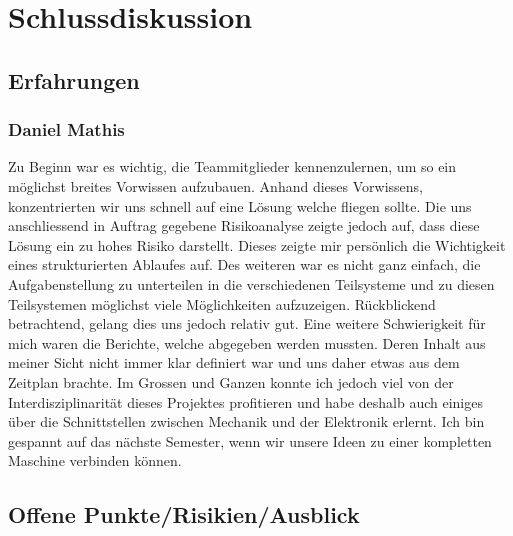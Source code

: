\section{Schlussdiskussion}

\subsection{Erfahrungen}

\subsubsection*{Daniel Mathis}
Zu Beginn war es wichtig, die Teammitglieder kennenzulernen, um so ein 
möglichst breites Vorwissen aufzubauen. Anhand dieses Vorwissens, 
konzentrierten wir uns schnell auf eine Lösung welche fliegen sollte. Die uns 
anschliessend in Auftrag gegebene Risikoanalyse zeigte jedoch auf, dass diese 
Lösung ein zu hohes Risiko darstellt. Dieses zeigte mir persönlich die 
Wichtigkeit eines strukturierten Ablaufes auf. Des weiteren war es nicht ganz 
einfach, die Aufgabenstellung zu unterteilen in die verschiedenen Teilsysteme 
und zu diesen Teilsystemen möglichst viele Möglichkeiten aufzuzeigen. 
Rückblickend betrachtend, gelang dies uns jedoch relativ gut. Eine weitere 
Schwierigkeit für mich waren die Berichte, welche abgegeben werden mussten. 
Deren Inhalt aus meiner Sicht nicht immer klar definiert war und uns daher 
etwas aus dem Zeitplan brachte. Im Grossen und Ganzen konnte ich jedoch viel 
von der Interdisziplinarität dieses Projektes profitieren und habe deshalb 
auch einiges über die Schnittstellen zwischen Mechanik und der Elektronik 
erlernt. Ich bin gespannt auf das nächste Semester, wenn wir unsere Ideen zu 
einer kompletten Maschine verbinden können.

\subsection{Offene Punkte/Risikien/Ausblick}

